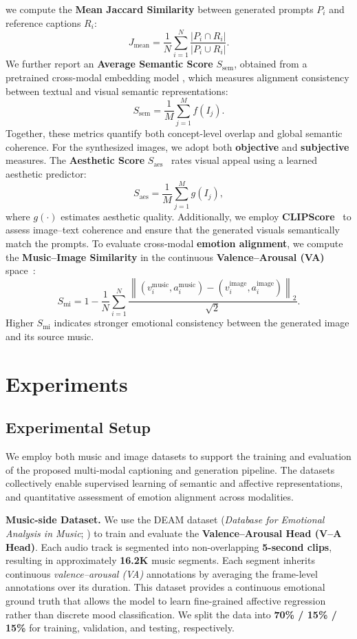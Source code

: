 \documentclass[letterpaper]{article}
\begin{document}
we compute the \textbf{Mean Jaccard Similarity} between generated prompts $P_i$ and reference captions $R_i$:
\[
J_{\mathrm{mean}} = \frac{1}{N} \sum_{i=1}^{N} \frac{|P_i \cap R_i|}{|P_i \cup R_i|}.
\]
We further report an \textbf{Average Semantic Score} $S_{\mathrm{sem}}$, obtained from a pretrained cross-modal 
embedding model \cite{radford2021clip}, which measures alignment consistency between textual 
and visual semantic representations:
\[
S_{\mathrm{sem}} = \frac{1}{M} \sum_{j=1}^{M} f(I_j).
\]
Together, these metrics quantify both concept-level overlap and global semantic coherence.
For the synthesized images, we adopt both \textbf{objective} and \textbf{subjective} measures. 
The \textbf{Aesthetic Score} $S_{\mathrm{aes}}$~\cite{schuhmann2022laion} rates visual appeal using a learned aesthetic predictor:
\[
S_{\mathrm{aes}} = \frac{1}{M} \sum_{j=1}^{M} g(I_j),
\]
where $g(\cdot)$ estimates aesthetic quality. 
Additionally, we employ \textbf{CLIPScore}~\cite{hessel2022clipscore} to assess image--text coherence 
and ensure that the generated visuals semantically match the prompts.
To evaluate cross-modal \textbf{emotion alignment}, we compute the \textbf{Music--Image Similarity} in the continuous 
\textbf{Valence--Arousal (VA)} space~\cite{aljanaki2017deam}:
\[
S_{\mathrm{mi}} = 1 - \frac{1}{N} \sum_{i=1}^{N} 
\frac{\left\| (v_i^{\mathrm{music}}, a_i^{\mathrm{music}}) - (v_i^{\mathrm{image}}, a_i^{\mathrm{image}}) \right\|_2}{\sqrt{2}}.
\]
Higher $S_{\mathrm{mi}}$ indicates stronger emotional consistency between the generated image and its source music.

\section{Experiments}
\subsection{Experimental Setup}
We employ both music and image datasets to support the training and evaluation of the proposed multi-modal captioning and generation pipeline.
The datasets collectively enable supervised learning of semantic and affective representations, and quantitative assessment of emotion alignment across modalities.

\textbf{Music-side Dataset.}  
We use the DEAM dataset (\textit{Database for Emotional Analysis in Music}; \cite{aljanaki2017deam}) to train and evaluate the \textbf{Valence–Arousal Head (V--A Head)}.  
Each audio track is segmented into non-overlapping \textbf{5-second clips}, resulting in approximately \textbf{16.2K} music segments. Each segment inherits continuous \textit{valence–arousal (VA)} annotations by averaging the frame-level annotations over its duration.  
This dataset provides a continuous emotional ground truth that allows the model to learn fine-grained affective regression rather than discrete mood classification.  
We split the data into \textbf{70\% / 15\% / 15\%} for training, validation, and testing, respectively.
\end{document}
